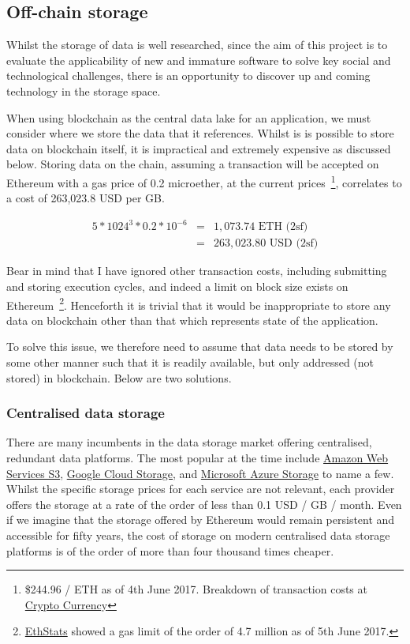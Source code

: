 \subsection{Off-chain storage}

Whilst the storage of data is well researched, since the aim of this project is to evaluate the applicability of new and immature software to solve key social and technological challenges, there is an opportunity to discover up and coming technology in the storage space.

When using blockchain as the central data lake for an application, we must consider where we store the data that it references. Whilst is is possible to store data on blockchain itself, it is impractical and extremely expensive as discussed below. Storing data on the chain, assuming a transaction will be accepted on Ethereum with a gas price of 0.2 microether, at the current prices~\footnote{\$244.96 / ETH as of 4th June 2017. Breakdown of transaction costs at \href{https://www.cryptocompare.com/coins/guides/what-is-the-gas-in-ethereum/}{Crypto Currency}}, correlates to a cost of 263,023.8 USD per GB.

$$
\begin{aligned}
5 * 1024^{3} * 0.2 * 10^{-6} &=& 1,073.74 \text{ ETH (2sf)} \\
&=& 263,023.80 \text{ USD (2sf)}
\end{aligned}
$$

Bear in mind that I have ignored other transaction costs, including submitting and storing execution cycles, and indeed a limit on block size exists on Ethereum~\footnote{\href{https://ethstats.net/}{EthStats} showed a gas limit of the order of 4.7 million as of 5th June 2017.}. Henceforth it is trivial that it would be inappropriate to store any data on blockchain other than that which represents state of the application.

To solve this issue, we therefore need to assume that data needs to be stored by some other manner such that it is readily available, but only addressed (not stored) in blockchain. Below are two solutions.

\subsubsection{Centralised data storage}

There are many incumbents in the data storage market offering centralised, redundant data platforms. The most popular at the time include \href{https://aws.amazon.com/s3/}{Amazon Web Services S3}, \href{https://cloud.google.com/storage/}{Google Cloud Storage}, and \href{https://azure.microsoft.com/en-gb/services/storage/}{Microsoft Azure Storage} to name a few. Whilst the specific storage prices for each service are not relevant, each provider offers the storage at a rate of the order of less than 0.1 USD / GB / month. Even if we imagine that the storage offered by Ethereum would remain persistent and accessible for fifty years, the cost of storage on modern centralised data storage platforms is of the order of more than four thousand times cheaper. 


